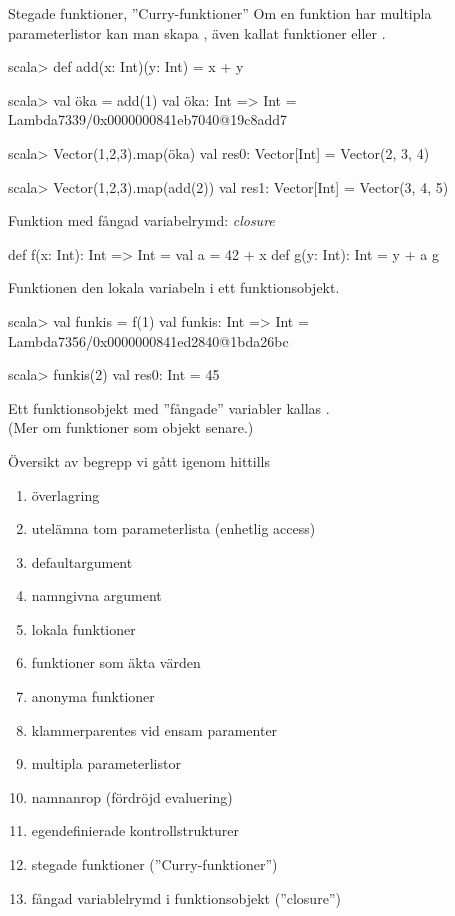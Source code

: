 \begin{Slide}{Stegade funktioner, ''Curry-funktioner''}
Om en funktion har multipla parameterlistor kan man skapa , även kallat  funktioner  eller .
\begin{REPLnonum}
scala> def add(x: Int)(y: Int) = x + y

scala> val öka = add(1)
val öka: Int => Int = Lambda7339/0x0000000841eb7040@19c8add7

scala> Vector(1,2,3).map(öka)
val res0: Vector[Int] = Vector(2, 3, 4)

scala> Vector(1,2,3).map(add(2))
val res1: Vector[Int] = Vector(3, 4, 5)
\end{REPLnonum}
\end{Slide}


\begin{Slide}{Funktion med fångad variabelrymd: \textit{closure}}
\begin{Code}
def f(x: Int): Int => Int = 
  val a = 42 + x
  def g(y: Int): Int = y + a
  g
\end{Code}
Funktionen   den lokala variabeln  i ett funktionsobjekt.
\pause
\begin{REPLnonum}
scala> val funkis = f(1)
val funkis: Int => Int = Lambda7356/0x0000000841ed2840@1bda26bc

scala> funkis(2)
val res0: Int = 45
\end{REPLnonum}
\pause
Ett funktionsobjekt med ''fångade'' variabler kallas . \\
(Mer om funktioner som objekt senare.)
\end{Slide}

\ifkompendium\else
\begin{SlideExtra}{Översikt av begrepp vi gått igenom hittills}
\begin{enumerate}
\item överlagring
\item utelämna tom parameterlista (enhetlig access)
\item defaultargument
\item namngivna argument
\item lokala funktioner
\item funktioner som äkta värden
\item anonyma funktioner
\item klammerparentes vid ensam paramenter
\item multipla parameterlistor
\item namnanrop (fördröjd evaluering)
\item egendefinierade kontrollstrukturer
\item stegade funktioner (''Curry-funktioner'')
\item fångad variablelrymd i funktionsobjekt (''closure'')
\end{enumerate}
\end{SlideExtra}
\fi



